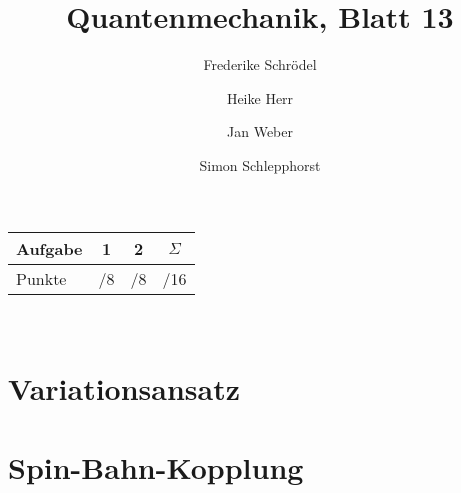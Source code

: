 \documentclass[11pt, ngerman, fleqn, DIV=15, headinclude]{scrartcl}
\title{Quantenmechanik, Blatt 13}
\author{
    Frederike Schrödel \and Heike Herr \and Jan Weber \and Simon Schlepphorst
}
\begin{document}
\maketitle
\begin{center}
	\begin{tabular}{l|c|c|c}
		Aufgabe &1&2&$\Sigma$\\
		\hline
		Punkte &\quad /8 & \quad /8 & \quad /16
	\end{tabular}\\
\end{center}

\section{Variationsansatz}

\section{Spin-Bahn-Kopplung}
\end{document}
